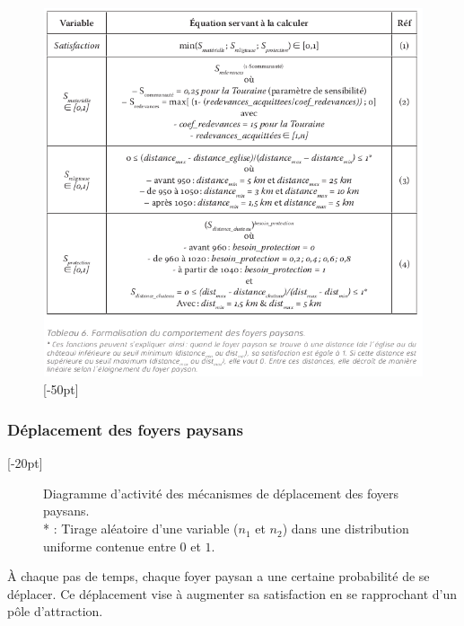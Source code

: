 \begin{figure}[H]
\centering
\includegraphics[width=1\linewidth]{src/Chapitre_TMD/Tab6.png}
[-50pt]
\end{figure}

\clearpage
\subsubsection{Déplacement des foyers paysans}[-20pt]

\begin{figure}[H]
	
	\caption{Diagramme d'activité des mécanismes de déplacement des foyers paysans.\\
	* : Tirage aléatoire d'une variable ($n_1$ et $n_2$) dans une distribution uniforme contenue entre $0$ et $1$.}
\end{figure}

À chaque pas de temps, chaque foyer paysan a une certaine probabilité de se déplacer.
Ce déplacement vise à augmenter sa satisfaction en se rapprochant d'un pôle d'attraction.

